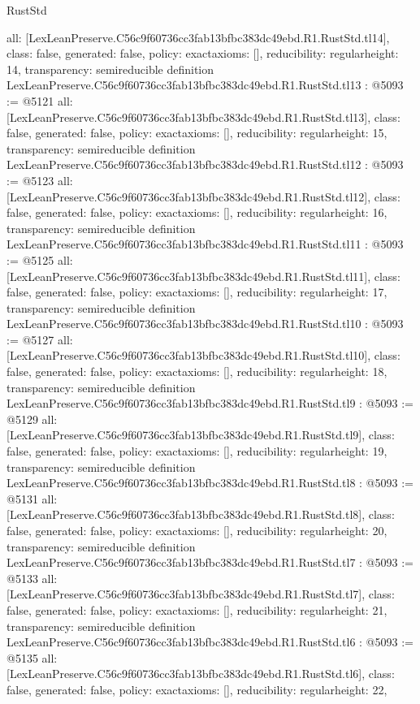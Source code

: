 \begin{lexlean}{RustStd}
\begin{coremodule}
{  all: [LexLeanPreserve.C56c9f60736cc3fab13bfbc383dc49ebd.R1.RustStd.tl14],
  class: false,
  generated: false,
  policy: exact{axioms: []},
  reducibility: regular{height: 14},
  transparency: semireducible
}
definition LexLeanPreserve.C56c9f60736cc3fab13bfbc383dc49ebd.R1.RustStd.tl13 : @5093 := @5121 {
  all: [LexLeanPreserve.C56c9f60736cc3fab13bfbc383dc49ebd.R1.RustStd.tl13],
  class: false,
  generated: false,
  policy: exact{axioms: []},
  reducibility: regular{height: 15},
  transparency: semireducible
}
definition LexLeanPreserve.C56c9f60736cc3fab13bfbc383dc49ebd.R1.RustStd.tl12 : @5093 := @5123 {
  all: [LexLeanPreserve.C56c9f60736cc3fab13bfbc383dc49ebd.R1.RustStd.tl12],
  class: false,
  generated: false,
  policy: exact{axioms: []},
  reducibility: regular{height: 16},
  transparency: semireducible
}
definition LexLeanPreserve.C56c9f60736cc3fab13bfbc383dc49ebd.R1.RustStd.tl11 : @5093 := @5125 {
  all: [LexLeanPreserve.C56c9f60736cc3fab13bfbc383dc49ebd.R1.RustStd.tl11],
  class: false,
  generated: false,
  policy: exact{axioms: []},
  reducibility: regular{height: 17},
  transparency: semireducible
}
definition LexLeanPreserve.C56c9f60736cc3fab13bfbc383dc49ebd.R1.RustStd.tl10 : @5093 := @5127 {
  all: [LexLeanPreserve.C56c9f60736cc3fab13bfbc383dc49ebd.R1.RustStd.tl10],
  class: false,
  generated: false,
  policy: exact{axioms: []},
  reducibility: regular{height: 18},
  transparency: semireducible
}
definition LexLeanPreserve.C56c9f60736cc3fab13bfbc383dc49ebd.R1.RustStd.tl9 : @5093 := @5129 {
  all: [LexLeanPreserve.C56c9f60736cc3fab13bfbc383dc49ebd.R1.RustStd.tl9],
  class: false,
  generated: false,
  policy: exact{axioms: []},
  reducibility: regular{height: 19},
  transparency: semireducible
}
definition LexLeanPreserve.C56c9f60736cc3fab13bfbc383dc49ebd.R1.RustStd.tl8 : @5093 := @5131 {
  all: [LexLeanPreserve.C56c9f60736cc3fab13bfbc383dc49ebd.R1.RustStd.tl8],
  class: false,
  generated: false,
  policy: exact{axioms: []},
  reducibility: regular{height: 20},
  transparency: semireducible
}
definition LexLeanPreserve.C56c9f60736cc3fab13bfbc383dc49ebd.R1.RustStd.tl7 : @5093 := @5133 {
  all: [LexLeanPreserve.C56c9f60736cc3fab13bfbc383dc49ebd.R1.RustStd.tl7],
  class: false,
  generated: false,
  policy: exact{axioms: []},
  reducibility: regular{height: 21},
  transparency: semireducible
}
definition LexLeanPreserve.C56c9f60736cc3fab13bfbc383dc49ebd.R1.RustStd.tl6 : @5093 := @5135 {
  all: [LexLeanPreserve.C56c9f60736cc3fab13bfbc383dc49ebd.R1.RustStd.tl6],
  class: false,
  generated: false,
  policy: exact{axioms: []},
  reducibility: regular{height: 22},
}
\end{coremodule}
\end{lexlean}
